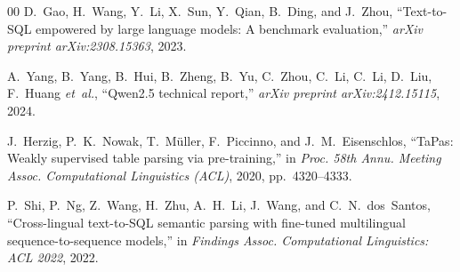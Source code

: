\documentclass[conference]{IEEEtran}
\begin{document}
\begin{thebibliography}{00}
D.~Gao, H.~Wang, Y.~Li, X.~Sun, Y.~Qian, B.~Ding, and J.~Zhou, ``Text-to-{SQL} empowered by large language models: A benchmark evaluation,'' \emph{arXiv preprint arXiv:2308.15363}, 2023.

A.~Yang, B.~Yang, B.~Hui, B.~Zheng, B.~Yu, C.~Zhou, C.~Li, C.~Li, D.~Liu, F.~Huang \emph{et~al.}, ``Qwen2.5 technical report,'' \emph{arXiv preprint arXiv:2412.15115}, 2024.

J.~Herzig, P.~K.~Nowak, T.~M\"{u}ller, F.~Piccinno, and J.~M.~Eisenschlos, ``{TaPas}: Weakly supervised table parsing via pre-training,'' in \emph{Proc. 58th Annu. Meeting Assoc. Computational Linguistics (ACL)}, 2020, pp.~4320--4333.

P.~Shi, P.~Ng, Z.~Wang, H.~Zhu, A.~H.~Li, J.~Wang, and C.~N.~dos~Santos, ``Cross-lingual text-to-{SQL} semantic parsing with fine-tuned multilingual sequence-to-sequence models,'' in \emph{Findings Assoc. Computational Linguistics: ACL 2022}, 2022.

\end{thebibliography}
\end{document}
